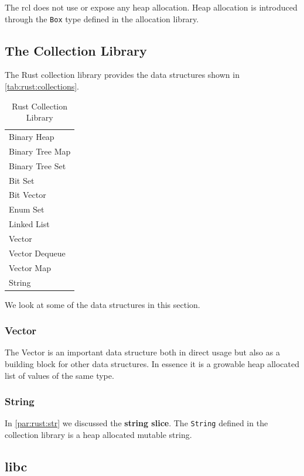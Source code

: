 The \gls{rcl} does not use or expose any heap allocation.
Heap allocation is introduced through the \texttt{Box} type defined in the allocation library.

\subsection{The Collection Library}

The Rust collection library provides the data structures shown in \autoref{tab:rust:collections}.

\begin{table}[H]
  \begin{tabular}{l}
    Binary Heap \\
    Binary Tree Map \\
    Binary Tree Set \\
    Bit Set \\
    Bit Vector \\
    Enum Set \\
    Linked List \\
    Vector \\
    Vector Dequeue \\
    Vector Map \\
    String \\
  \end{tabular}
  \caption{Rust Collection Library}
  \label{tab:rust:collections}
\end{table}

We look at some of the data structures in this section.

\subsubsection{Vector}

The Vector is an important data structure both in direct usage but also as a building block for other data structures.
In essence it is a growable heap allocated list of values of the same type.

\subsubsection{String}

In \autoref{par:rust:str} we discussed the \textbf{string slice}.
The \texttt{String} defined in the collection library is a heap allocated mutable string.

\subsection{libc}

